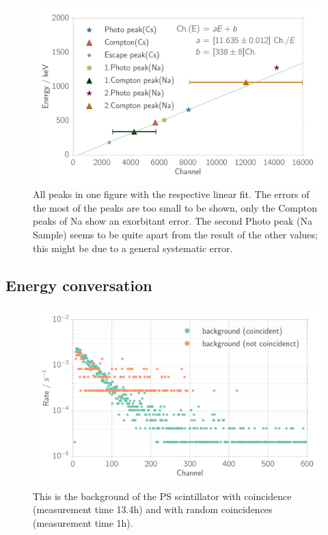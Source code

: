 \begin{figure}[htpb]
    \centering
    \includegraphics[width=0.9\linewidth]{./analysis/figures/calibration_na_linear_fit}
    \caption{All peaks in one figure with the respective linear fit. The errors of
    the most of the peaks are too small to be shown, only the Compton peaks of Na show
    an exorbitant error. The second Photo peak (Na Sample) seems to be quite apart from
    the result of the other values; this might be due to a general systematic error.}
\label{fig:calibration_na_linear_fit}
\end{figure}
\clearpage
\subsection{Energy conversation}
\label{sub:energy_conversation}
\begin{figure}[htpb]
    \centering
    \includegraphics[width=0.9\linewidth]{./analysis/figures/coin_background_random}
    \caption{This is the background of the PS scintillator with coincidence
        (measurement time 13.4h)  
 and with random coincidences (measurement time 1h).}
\label{fig:coin_ps_background}
\end{figure}

